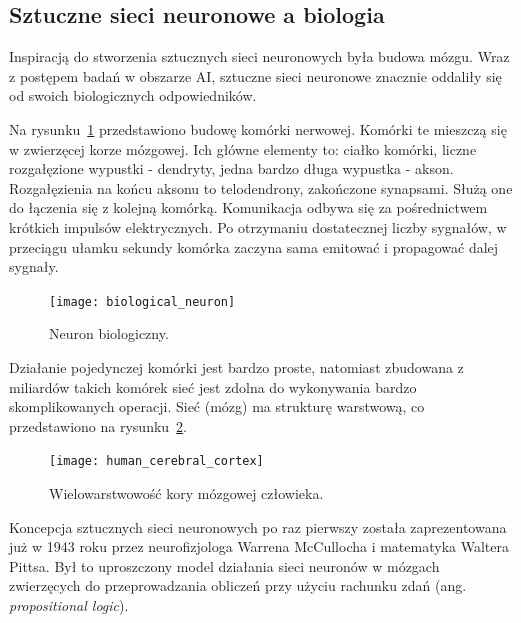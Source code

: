 \documentclass[a4paper,12pt]{article}
\numberwithin{figure}{section}
\begin{document}
    \subsection{Sztuczne sieci neuronowe a biologia}

    Inspiracją do stworzenia sztucznych sieci neuronowych była budowa mózgu. Wraz z postępem badań w obszarze AI, sztuczne sieci neuronowe znacznie oddaliły się od swoich biologicznych odpowiedników\cite{UczenieMaszynowe2018}.

    \bigskip

    Na rysunku~\ref{fig:biological_neuron} przedstawiono budowę komórki nerwowej. Komórki te mieszczą się w zwierzęcej korze mózgowej. Ich główne elementy to: ciałko komórki, liczne rozgałęzione wypustki - dendryty, jedna bardzo długa wypustka - akson. Rozgałęzienia na końcu aksonu to telodendrony, zakończone synapsami. Służą one do łączenia się z kolejną komórką. Komunikacja odbywa się za pośrednictwem krótkich impulsów elektrycznych. Po otrzymaniu dostatecznej liczby sygnałów, w przeciągu ułamku sekundy komórka zaczyna sama emitować i propagować dalej sygnały\cite{UczenieMaszynowe2018}.

    \bigskip

    \begin{figure}[H]
        \centering
        \texttt{[image: biological\_neuron]}
        \caption{Neuron biologiczny\cite{UczenieMaszynowe2018}.}
        \label{fig:biological_neuron}
    \end{figure}

    \bigskip

    Działanie pojedynczej komórki jest bardzo proste, natomiast zbudowana z miliardów takich komórek sieć jest zdolna do wykonywania bardzo skomplikowanych operacji. Sieć (mózg) ma strukturę warstwową, co przedstawiono na rysunku~\ref{fig:human_cerebral_cortex}\cite{UczenieMaszynowe2018}.

    \bigskip

    \begin{figure}[H]
        \centering
        \texttt{[image: human\_cerebral\_cortex]}
        \caption{Wielowarstwowość kory mózgowej człowieka\cite{UczenieMaszynowe2018}.}
        \label{fig:human_cerebral_cortex}
    \end{figure}

    \bigskip

    Koncepcja sztucznych sieci neuronowych po raz pierwszy została zaprezentowana już w 1943 roku przez neurofizjologa Warrena McCullocha i matematyka Waltera Pittsa\cite{BeginningsOfANN1943}. Był to uproszczony model działania sieci neuronów w mózgach zwierzęcych do przeprowadzania obliczeń przy użyciu rachunku zdań (ang. \textit{propositional logic})\cite{UczenieMaszynowe2018}.
\end{document}

